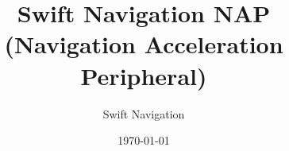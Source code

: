 \documentclass{article}
\title{Swift Navigation NAP\\(Navigation Acceleration Peripheral)}
\author{Swift Navigation}
\date{\today}
\begin{document}
\newcommand{\samplebits}{3}
\newcommand{\feclkfreq}{16.368}
\newcommand{\samplesperms}{16368}
\newcommand{\spiclkfreqs}{8.184, 16.368, 32.736, 49.104, 65.472, and 81.840 MHz}

\newcommand{\numtrackchans}{12}

\newcommand{\acqntaps}{16}
\newcommand{\acqfreqmult}{3}
\newcommand{\acqfreqmhz}{49.104}
\newcommand{\acqspeed}{80}
\newcommand{\acqlength}{49104}

\newcommand{\cwfreqmult}{4}
\newcommand{\cwfreqmhz}{65.472}
\newcommand{\cwgranularityhz}{15}
\newcommand{\cwlength}{65472}

\newcommand{\iirntaps}{5}
\newcommand{\iirfreqmhz}{81.840}
\newcommand{\iirnbits}{10}

\newcommand{\numcorrelators}{88}
\newcommand{\numgmaccs}{2.88}

\maketitle
\end{document}
